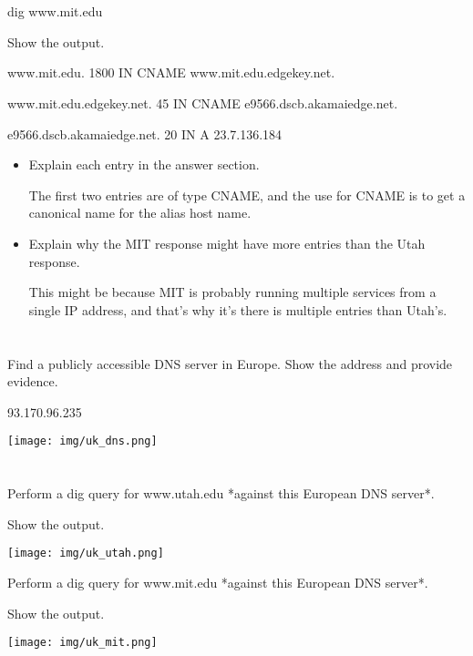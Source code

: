 \documentclass[11pt]{article}
\begin{document}
\section{} dig www.mit.edu

Show the output.

www.mit.edu. 1800 IN CNAME www.mit.edu.edgekey.net.

www.mit.edu.edgekey.net. 45 IN CNAME e9566.dscb.akamaiedge.net.

e9566.dscb.akamaiedge.net. 20 IN A 23.7.136.184


\begin{itemize}
\item Explain each entry in the answer section.

The first two entries are of type CNAME, and the use for CNAME is to get a canonical name for the alias host name.

\item Explain why the MIT response might have more entries than the Utah response.

This might be because MIT is probably running multiple services from a single IP address, and that's why it's
there is multiple entries than Utah's.

\end{itemize}

\section{} Find a publicly accessible DNS server in Europe. Show the address and provide evidence.

93.170.96.235

\texttt{[image: img/uk\_dns.png]}

\section{} 

Perform a dig query for www.utah.edu *against this European DNS server*.

Show the output.

\texttt{[image: img/uk\_utah.png]}

Perform a dig query for www.mit.edu *against this European DNS server*.

Show the output.

\texttt{[image: img/uk\_mit.png]}
\end{document}
